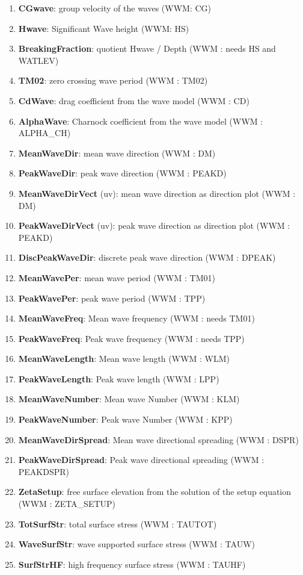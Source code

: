 \documentclass[12pt]{amsart}
\begin{document}
\begin{enumerate}
\item {\bf CGwave}: group velocity of the waves (WWM: CG)
\item {\bf Hwave}: Significant Wave height (WWM: HS)
\item {\bf BreakingFraction}: quotient Hwave / Depth (WWM : needs HS and WATLEV)
\item {\bf TM02}: zero crossing wave period (WWM : TM02)
\item {\bf CdWave}: drag coefficient from the wave model (WWM : CD)
\item {\bf AlphaWave}: Charnock coefficient from the wave model (WWM : ALPHA\_CH)
\item {\bf MeanWaveDir}: mean wave direction (WWM : DM)
\item {\bf PeakWaveDir}: peak wave direction (WWM : PEAKD)
\item {\bf MeanWaveDirVect} (uv): mean wave direction as direction plot (WWM : DM)
\item {\bf PeakWaveDirVect} (uv): peak wave direction as direction plot (WWM : PEAKD)
\item {\bf DiscPeakWaveDir}: discrete peak wave direction (WWM : DPEAK)
\item {\bf MeanWavePer}: mean wave period (WWM : TM01)
\item {\bf PeakWavePer}: peak wave period (WWM : TPP)
\item {\bf MeanWaveFreq}: Mean wave frequency (WWM : needs TM01)
\item {\bf PeakWaveFreq}: Peak wave frequency (WWM : needs TPP)
\item {\bf MeanWaveLength}: Mean wave length (WWM : WLM)
\item {\bf PeakWaveLength}: Peak wave length (WWM : LPP)
\item {\bf MeanWaveNumber}: Mean wave Number (WWM : KLM)
\item {\bf PeakWaveNumber}: Peak wave Number (WWM : KPP)
\item {\bf MeanWaveDirSpread}: Mean wave directional spreading (WWM : DSPR)
\item {\bf PeakWaveDirSpread}: Peak wave directional spreading (WWM : PEAKDSPR)
\item {\bf ZetaSetup}: free surface elevation from the solution of the setup equation (WWM : ZETA\_SETUP)
\item {\bf TotSurfStr}: total surface stress (WWM : TAUTOT)
\item {\bf WaveSurfStr}: wave supported surface stress (WWM : TAUW)
\item {\bf SurfStrHF}: high frequency surface stress (WWM : TAUHF)
\end{enumerate}
\end{document}
